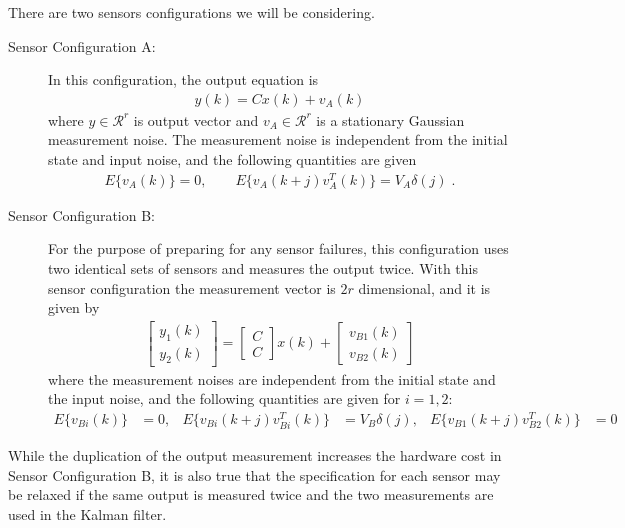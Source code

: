 There are two sensors configurations we will be considering.
\begin{description}
    \item[Sensor Configuration A:]
    In this configuration, the output equation is
    \begin{align*}
        y(k) = C x(k) + v_A(k)
    \end{align*}
    where $y \in \mathcal{R}^r$ is  output vector and $v_A \in \mathcal{R}^r$ is a stationary Gaussian measurement noise.  The measurement noise is independent from the initial state and input noise, and the following quantities are given
    \begin{align*}
        E \{ v_A(k) \} = 0,\hspace{2em} E \{ v_A(k+j) v_A^T(k) \} = V_A \delta(j) \; .
    \end{align*}

    \item[Sensor Configuration B:]
    For the purpose of preparing for any sensor failures, this configuration uses two identical sets of sensors and measures the output twice. With this sensor configuration the measurement vector is $2r$ dimensional, and it is given by
    \begin{align*}
        \begin{bmatrix}
                y_1(k) \\
                y_2(k)
            \end{bmatrix} = \begin{bmatrix}
                C \\
                C
            \end{bmatrix} x(k) + \begin{bmatrix}
                v_{B1}(k) \\
                v_{B2}(k)
            \end{bmatrix}
    \end{align*}
    where the measurement noises are independent from the initial state and the input noise, and the following quantities are given for $i = 1,2$:
    \begin{align*}
        E \{ v_{Bi}(k) \} & = 0,
            & E \{ v_{Bi}(k+j) v_{Bi}^T(k) \} & = V_B \delta(j),
            & E \{ v_{B1}(k+j) v_{B2}^T(k) \} & = 0
    \end{align*}

\end{description}

While the duplication of the output measurement increases the hardware cost in Sensor Configuration B, it is also true that the specification for each sensor may be relaxed if the same output is measured twice and the two measurements are  used in the Kalman filter.

